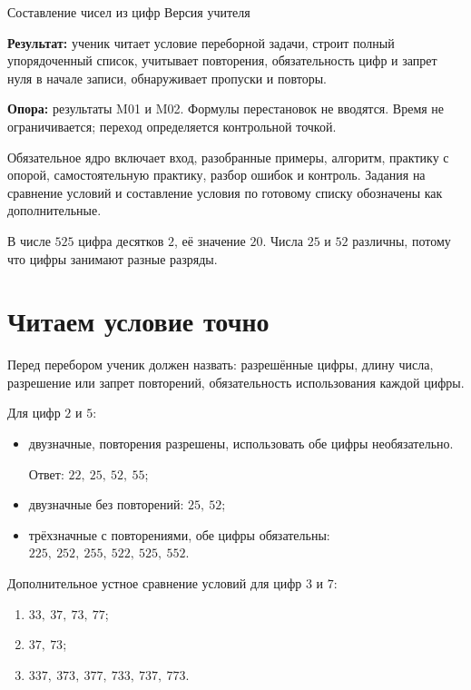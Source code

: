 \worksheettitle
  {Составление чисел из цифр}
  { Версия учителя}

\begin{teacherbox}
  \textbf{Результат:} ученик читает условие переборной задачи, строит полный
  упорядоченный список, учитывает повторения, обязательность цифр и запрет нуля
  в начале записи, обнаруживает пропуски и повторы.

  \textbf{Опора:} результаты M01 и M02. Формулы перестановок не вводятся.
  Время не ограничивается; переход определяется контрольной точкой.
\end{teacherbox}

\begin{teacherbox}
  Обязательное ядро включает вход, разобранные примеры, алгоритм, практику с
  опорой, самостоятельную практику, разбор ошибок и контроль. Задания на
  сравнение условий и составление условия по готовому списку обозначены как
  дополнительные.
\end{teacherbox}

\begin{checkpointbox}
  В числе \(525\) цифра десятков \(2\), её значение \(20\). Числа \(25\) и
  \(52\) различны, потому что цифры занимают разные разряды.
\end{checkpointbox}

\section{Читаем условие точно}

\begin{teacherbox}
  Перед перебором ученик должен назвать: разрешённые цифры, длину числа,
  разрешение или запрет повторений, обязательность использования каждой цифры.
\end{teacherbox}

Для цифр \(2\) и \(5\):
\begin{itemize}
  \item двузначные, повторения разрешены, использовать обе цифры необязательно.
    \par Ответ: \(22,\ 25,\ 52,\ 55\);
  \item двузначные без повторений: \(25,\ 52\);
  \item трёхзначные с повторениями, обе цифры обязательны:
    \(225,\ 252,\ 255,\ 522,\ 525,\ 552\).
\end{itemize}

Дополнительное устное сравнение условий для цифр \(3\) и \(7\):
\begin{enumerate}[nosep]
  \item \(33,\ 37,\ 73,\ 77\);
  \item \(37,\ 73\);
  \item \(337,\ 373,\ 377,\ 733,\ 737,\ 773\).
\end{enumerate}

